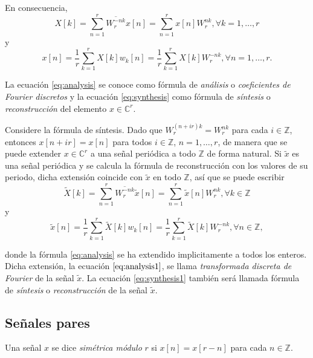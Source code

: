 En consecuencia,
\begin{equation}\label{eq:analysis}
    X[k] = \sum_{n=1}^{r} \overline{W_r^{-n k}} x[n] = \sum_{n=1}^{r} x[n] W_r^{n k}, \forall k=1,\ldots,r
\end{equation}
y
\begin{equation}\label{eq:synthesis}
    x[n] = \frac{1}{r} \sum_{k=1}^{r} X[k] w_k[n] = \frac{1}{r} \sum_{k=1}^{r} X[k] W_r^{- n k}, \forall n=1,\ldots,r.
\end{equation}

La ecuación \eqref{eq:analysis} se conoce como fórmula de \emph{análisis} o \emph{coeficientes de Fourier discretos} y la ecuación \eqref{eq:synthesis} como fórmula de \emph{síntesis} o \emph{reconstrucción} del elemento $x \in \mathbb{C}^r$.
\bigskip

Considere la fórmula de síntesis. Dado que $W_r^{(n + i r) k} = W_r^{n k}$ para cada $i \in \mathbb{Z}$, entonces $x[n + i r] = x[n]$ para todos $i \in \mathbb{Z}$, $n=1,\ldots,r$, de manera que se puede extender $x \in \mathbb{C}^r$ a una señal periódica a todo $\mathbb{Z}$ de forma natural. Si $\tilde{x}$ es una señal periódica y se calcula la fórmula de reconstrucción con los valores de su periodo, dicha extensión coincide con $\tilde{x}$ en todo $\mathbb{Z}$, así que se puede escribir
\begin{equation}\label{eq:analysis1}
    \tilde{X}[k] = \sum_{n=1}^{r} \overline{W_r^{-n k}} \tilde{x}[n] = \sum_{n=1}^{r} \tilde{x}[n] W_r^{n k}, \forall k \in \mathbb{Z}
\end{equation}
y
\begin{equation}\label{eq:synthesis1}
    \tilde{x}[n] = \frac{1}{r} \sum_{k=1}^{r} \tilde{X}[k] w_k[n] = \frac{1}{r} \sum_{k=1}^{r} \tilde{X}[k] W_r^{- n k}, \forall n \in \mathbb{Z},
\end{equation}

donde la fórmula \eqref{eq:analysis} se ha extendido implicitamente  a todos los enteros. Dicha extensión, la ecuación $\eqref{eq:analysis1}$, se llama \emph{transformada discreta de Fourier} de la señal $\tilde{x}$. La ecuación \eqref{eq:synthesis1} también será llamada fórmula de \emph{síntesis} o \emph{reconstrucción} de la señal $\tilde{x}$.

\subsection{Señales pares}

\begin{definition}
Una señal $x$ se dice \emph{simétrica módulo} $r$ si $x[n] = x[r-n]$ para cada $n \in \mathbb{Z}$.
\end{definition}

